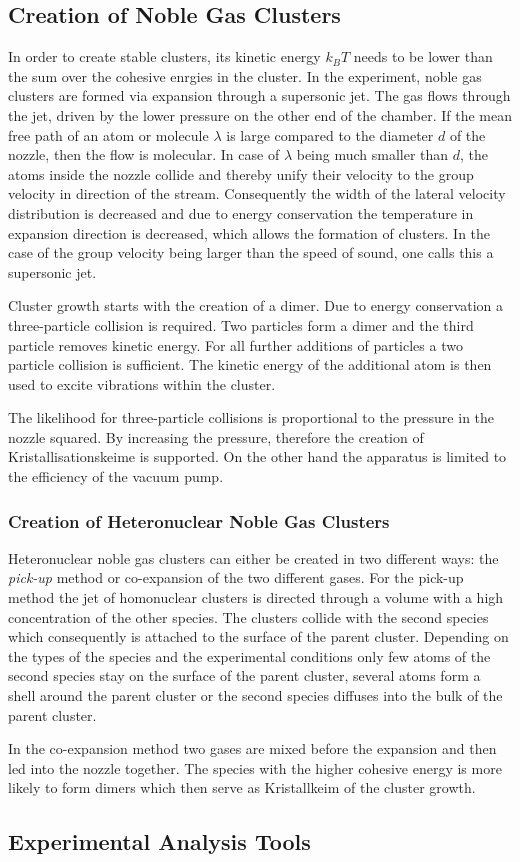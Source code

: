 \subsection{Creation of Noble Gas Clusters}
In order to create stable clusters, its kinetic energy $k_BT$ needs to be lower
than the sum over the cohesive enrgies in the cluster.
In the experiment, noble gas clusters are formed via expansion through
a supersonic jet. The gas flows through the jet, driven by the lower pressure
on the other end of the chamber. If the mean free path of an atom or molecule
$\lambda$ is large compared to the diameter $d$ of the nozzle, then the flow is
molecular. In case of $\lambda$ being much smaller than $d$, the atoms inside
the nozzle collide and thereby unify their velocity to the group velocity
in direction of the stream. Consequently the width of the lateral velocity
distribution is decreased and due to energy conservation the temperature
in expansion direction is decreased, which allows the formation of clusters.
In the case of the group velocity being larger than the speed of sound,
one calls this a supersonic jet.

Cluster growth starts with the creation of a dimer. Due to energy conservation
a three-particle collision is required. Two particles form a dimer and the
third particle removes kinetic energy. For all further additions of particles
a two particle collision is sufficient. The kinetic energy of the additional
atom is then used to excite vibrations within the cluster.

The likelihood for three-particle collisions is proportional to the pressure
in the nozzle squared. By increasing the pressure, therefore the creation
of Kristallisationskeime is supported. On the other hand the apparatus
is limited to the efficiency of the vacuum pump.

\subsubsection{Creation of Heteronuclear Noble Gas Clusters}
Heteronuclear noble gas clusters can either be created in two different ways:
the \emph{pick-up} method or co-expansion of the two different gases.
For the pick-up method the jet of homonuclear clusters is directed through
a volume with a high concentration of the other species. The clusters
collide with the second species which consequently is attached to the surface
of the parent cluster. Depending on the types of the species
and the experimental conditions only few atoms
of the second species stay on the surface of the parent cluster,
several atoms form a shell around the parent cluster or the second species
diffuses into the bulk of the parent cluster.

In the co-expansion method two gases are mixed before the expansion and
then led into the nozzle together. The species with the higher cohesive
energy is more likely to form dimers which then serve as Kristallkeim of
the cluster growth.



\subsection{Experimental Analysis Tools}
